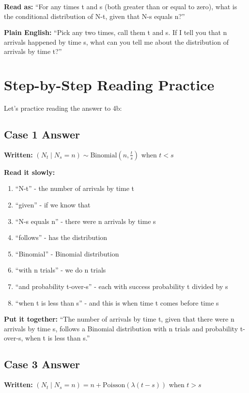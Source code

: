 \documentclass[11pt]{article}
\begin{document}
\textbf{Read as:} ``For any times t and s (both greater than or equal to zero), what is the conditional distribution of N-t, given that N-s equals n?''

\textbf{Plain English:} ``Pick any two times, call them t and s. If I tell you that n arrivals happened by time s, what can you tell me about the distribution of arrivals by time t?''

\section{Step-by-Step Reading Practice}

Let's practice reading the answer to 4b:

\subsection{Case 1 Answer}

\textbf{Written:} $(N_t \mid N_s = n) \sim \text{Binomial}\left(n, \frac{t}{s}\right)$ when $t < s$

\textbf{Read it slowly:}
\begin{enumerate}
    \item ``N-t'' - the number of arrivals by time t
    \item ``given'' - if we know that
    \item ``N-s equals n'' - there were n arrivals by time s
    \item ``follows'' - has the distribution
    \item ``Binomial'' - Binomial distribution
    \item ``with n trials'' - we do n trials
    \item ``and probability t-over-s'' - each with success probability t divided by s
    \item ``when t is less than s'' - and this is when time t comes before time s
\end{enumerate}

\textbf{Put it together:} ``The number of arrivals by time t, given that there were n arrivals by time s, follows a Binomial distribution with n trials and probability t-over-s, when t is less than s.''

\subsection{Case 3 Answer}

\textbf{Written:} $(N_t \mid N_s = n) = n + \text{Poisson}(\lambda(t-s))$ when $t > s$
\end{document}
